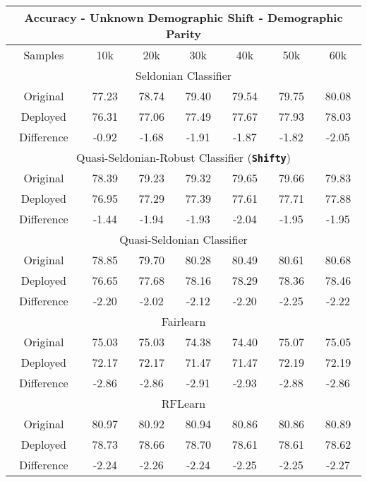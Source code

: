 \begin{table}[ht]
\footnotesize
\centering
\begin{tabular}{|c|cccccc|}
\hline
\multicolumn{7}{|c|}{Accuracy - Unknown Demographic Shift - Demographic Parity} \\ \hline

Samples & 10k & 20k & 30k & 40k & 50k & 60k \\ \hline

\multicolumn{7}{|c|}{Seldonian Classifier} \\ \hline
Original & 77.23 & 78.74 & 79.40 & 79.54 & 79.75 & 80.08 \\ \hline
Deployed & 76.31 & 77.06 & 77.49 & 77.67 & 77.93 & 78.03 \\ \hline
Difference & -0.92 & -1.68 & -1.91 & -1.87 & -1.82 & -2.05 \\ \hline

\multicolumn{7}{|c|}{Quasi-Seldonian-Robust Classifier (\textbf{\texttt{Shifty}})} \\ \hline
Original & 78.39 & 79.23 & 79.32 & 79.65 & 79.66 & 79.83 \\ \hline 
Deployed & 76.95 & 77.29 & 77.39 & 77.61 & 77.71 & 77.88 \\ \hline 
Difference & -1.44 & -1.94 & -1.93 & -2.04 & -1.95 & -1.95 \\ \hline

\multicolumn{7}{|c|}{Quasi-Seldonian Classifier} \\ \hline
Original & 78.85 & 79.70 & 80.28 & 80.49 & 80.61 & 80.68 \\ \hline
Deployed & 76.65 & 77.68 & 78.16 & 78.29 & 78.36 & 78.46 \\ \hline
Difference & -2.20 & -2.02 & -2.12 & -2.20 & -2.25 & -2.22 \\ \hline

\multicolumn{7}{|c|}{Fairlearn} \\ \hline
Original & 75.03 & 75.03 & 74.38 & 74.40 & 75.07 & 75.05 \\ \hline
Deployed & 72.17 & 72.17 & 71.47 & 71.47 & 72.19 & 72.19 \\ \hline
Difference & -2.86 & -2.86 & -2.91 & -2.93 & -2.88 & -2.86 \\ \hline

\multicolumn{7}{|c|}{RFLearn} \\ \hline
Original & 80.97 & 80.92 & 80.94 & 80.86 & 80.86 & 80.89 \\ \hline 
Deployed & 78.73 & 78.66 & 78.70 & 78.61 & 78.61 & 78.62 \\ \hline
Difference & -2.24 & -2.26 & -2.24 & -2.25 & -2.25 & -2.27 \\ \hline


\end{tabular}
\end{table}
